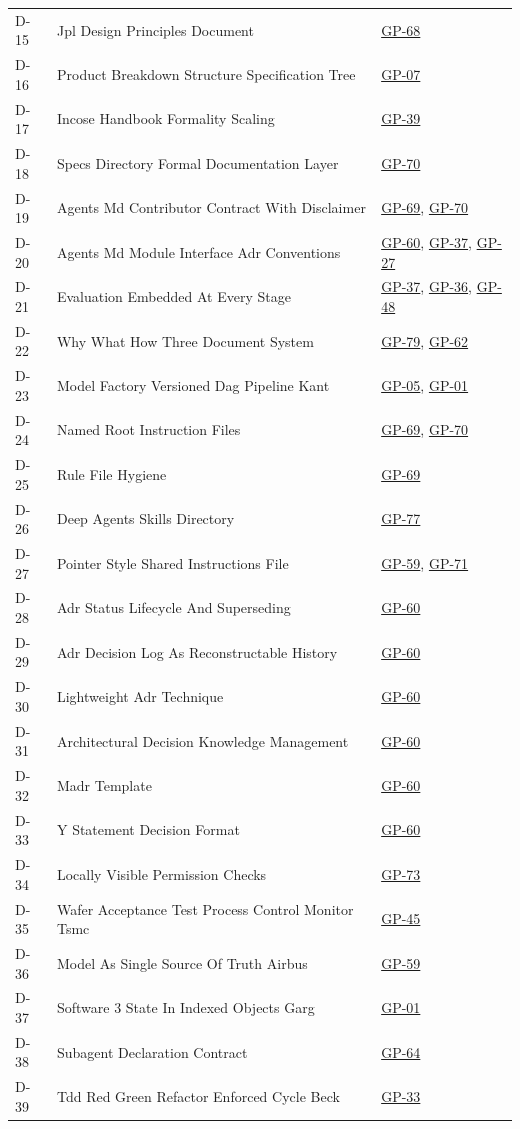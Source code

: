 \begin{longtable}{@{}l p{} p{}@{}}
D-15 & Jpl Design Principles Document & \hyperlink{gp-68}{GP-68} \\
D-16 & Product Breakdown Structure Specification Tree & \hyperlink{gp-07}{GP-07} \\
D-17 & Incose Handbook Formality Scaling & \hyperlink{gp-39}{GP-39} \\
D-18 & Specs Directory Formal Documentation Layer & \hyperlink{gp-70}{GP-70} \\
D-19 & Agents Md Contributor Contract With Disclaimer & \hyperlink{gp-69}{GP-69}, \hyperlink{gp-70}{GP-70} \\
D-20 & Agents Md Module Interface Adr Conventions & \hyperlink{gp-60}{GP-60}, \hyperlink{gp-37}{GP-37}, \hyperlink{gp-27}{GP-27} \\
D-21 & Evaluation Embedded At Every Stage & \hyperlink{gp-37}{GP-37}, \hyperlink{gp-36}{GP-36}, \hyperlink{gp-48}{GP-48} \\
D-22 & Why What How Three Document System & \hyperlink{gp-79}{GP-79}, \hyperlink{gp-62}{GP-62} \\
D-23 & Model Factory Versioned Dag Pipeline Kant & \hyperlink{gp-05}{GP-05}, \hyperlink{gp-01}{GP-01} \\
D-24 & Named Root Instruction Files & \hyperlink{gp-69}{GP-69}, \hyperlink{gp-70}{GP-70} \\
D-25 & Rule File Hygiene & \hyperlink{gp-69}{GP-69} \\
D-26 & Deep Agents Skills Directory & \hyperlink{gp-77}{GP-77} \\
D-27 & Pointer Style Shared Instructions File & \hyperlink{gp-59}{GP-59}, \hyperlink{gp-71}{GP-71} \\
D-28 & Adr Status Lifecycle And Superseding & \hyperlink{gp-60}{GP-60} \\
D-29 & Adr Decision Log As Reconstructable History & \hyperlink{gp-60}{GP-60} \\
D-30 & Lightweight Adr Technique & \hyperlink{gp-60}{GP-60} \\
D-31 & Architectural Decision Knowledge Management & \hyperlink{gp-60}{GP-60} \\
D-32 & Madr Template & \hyperlink{gp-60}{GP-60} \\
D-33 & Y Statement Decision Format & \hyperlink{gp-60}{GP-60} \\
D-34 & Locally Visible Permission Checks & \hyperlink{gp-73}{GP-73} \\
D-35 & Wafer Acceptance Test Process Control Monitor Tsmc & \hyperlink{gp-45}{GP-45} \\
D-36 & Model As Single Source Of Truth Airbus & \hyperlink{gp-59}{GP-59} \\
D-37 & Software 3 State In Indexed Objects Garg & \hyperlink{gp-01}{GP-01} \\
D-38 & Subagent Declaration Contract & \hyperlink{gp-64}{GP-64} \\
D-39 & Tdd Red Green Refactor Enforced Cycle Beck & \hyperlink{gp-33}{GP-33} \\
\bottomrule
\end{longtable}
\endgroup

